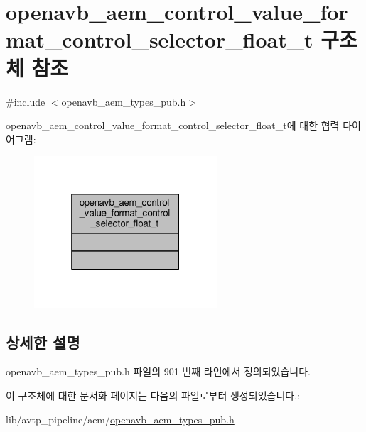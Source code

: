 \hypertarget{structopenavb__aem__control__value__format__control__selector__float__t}{}\section{openavb\+\_\+aem\+\_\+control\+\_\+value\+\_\+format\+\_\+control\+\_\+selector\+\_\+float\+\_\+t 구조체 참조}
\label{structopenavb__aem__control__value__format__control__selector__float__t}


{\ttfamily \#include $<$openavb\+\_\+aem\+\_\+types\+\_\+pub.\+h$>$}



openavb\+\_\+aem\+\_\+control\+\_\+value\+\_\+format\+\_\+control\+\_\+selector\+\_\+float\+\_\+t에 대한 협력 다이어그램\+:
\nopagebreak
\begin{figure}[H]
\begin{center}
\leavevmode
\includegraphics[width=193pt]{structopenavb__aem__control__value__format__control__selector__float__t__coll__graph}
\end{center}
\end{figure}


\subsection{상세한 설명}


openavb\+\_\+aem\+\_\+types\+\_\+pub.\+h 파일의 901 번째 라인에서 정의되었습니다.



이 구조체에 대한 문서화 페이지는 다음의 파일로부터 생성되었습니다.\+:\begin{DoxyCompactItemize}
\item 
lib/avtp\+\_\+pipeline/aem/\hyperlink{openavb__aem__types__pub_8h}{openavb\+\_\+aem\+\_\+types\+\_\+pub.\+h}\end{DoxyCompactItemize}
